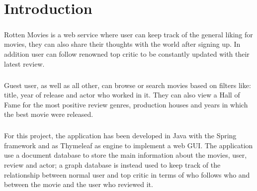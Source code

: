 %


%

\chapter{Introduction}
\justifying
\paragraph{}
Rotten Movies is a web service where user can keep track of the general liking for movies, they can also share their thoughts with the world after signing up. In addition user can follow renowned top critic to be constantly updated with their latest review.
\paragraph{}
Guest user, as well as all other, can browse or search movies based on filters like: title, year of release and actor who worked in it. They can also view a Hall of Fame for the most positive review genres, production houses and years in which the best movie were released.
\paragraph{}
For this project, the application has been developed in Java with the Spring framework and as Thymeleaf as engine to implement a web GUI. The application use a document database to store the main information about the movies, user, review and actor; a graph database is instead used to keep track of the relationship between normal user and top critic in terms of who follows who and between the movie and the user who reviewed it.
%

